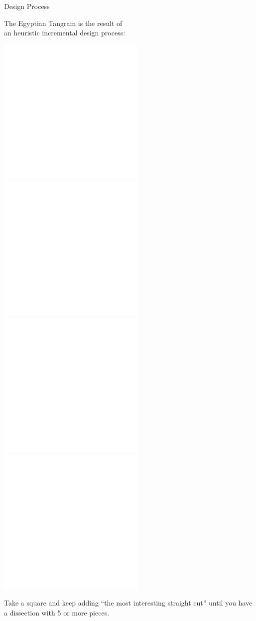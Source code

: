 \documentclass[14pt]{beamer}
\begin{document}

    \begin{frame}{Design Process}
        \begin{center}
            The Egyptian Tangram is the result of\\an heuristic incremental design process:

            \bigskip\bigskip\bigskip

            \includegraphics[height=10ex]{figures/figure001e.pdf} \quad \includegraphics[height=10ex]{figures/figure001d.pdf} \quad \includegraphics[height=10ex]{figures/figure001c.pdf} \quad \includegraphics[height=10ex]{figures/figure001b.pdf} \\

            \bigskip\bigskip\bigskip

            {\small Take a square and keep adding ``the most interesting straight cut'' until you have a dissection with 5 or more pieces.}
        \end{center}
    \end{frame}

\end{document}
